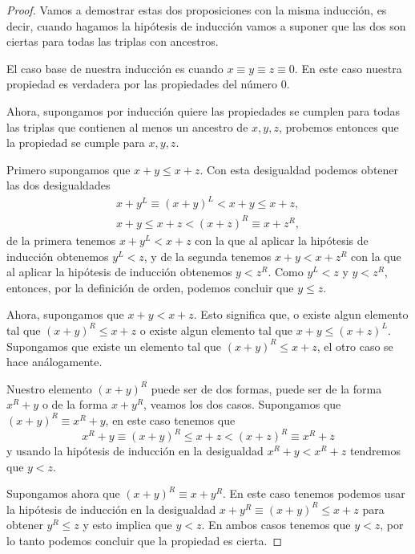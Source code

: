     \begin{proof}
        Vamos a demostrar estas dos proposiciones con la misma inducci\'on, es decir, cuando hagamos la hip\'otesis de inducci\'on vamos a suponer que las dos son ciertas para todas las triplas con ancestros.

        El caso base de nuestra inducci\'on es cuando $x\equiv y \equiv z \equiv 0$. En este caso nuestra propiedad es verdadera por las propiedades del n\'umero $0$.

        Ahora, supongamos por inducci\'on quiere las propiedades se cumplen para todas las triplas que contienen al menos un ancestro de $x,y,z$, probemos entonces que la propiedad se cumple para $x,y,z$.

        Primero supongamos que $x+y\le x+z$. Con esta desigualdad podemos obtener las dos desigualdades
        \begin{align*}
            x+y^L \equiv (x+y)^L < x+y \le x + z,\\
            x+y \le x+z < (x+z)^R \equiv x+z^R,
        \end{align*}
        de la primera tenemos $x + y^L < x + z$ con la que al aplicar la hip\'otesis de inducci\'on obtenemos $y^L < z$, y de la segunda tenemos $x+y < x+z^R$ con la que al aplicar la hip\'otesis de inducci\'on obtenemos $y < z^R$. Como $y^L < z$ y $y < z^R$, entonces, por la definici\'on de orden, podemos concluir que $y \le z$.

        Ahora, supongamos que $x+y < x+z$. Esto significa que, o existe algun elemento tal que $(x+y)^R \le x+z$ o existe algun elemento tal que $x+y \le (x+z)^L$. Supongamos que existe un elemento tal que $(x+y)^R \le x+z$, el otro caso se hace an\'alogamente.

        Nuestro elemento $(x+y)^R$ puede ser de dos formas, puede ser de la forma $x^R+y$ o de la forma $x+y^R$, veamos los dos casos. Supongamos que $(x+y)^R\equiv x^R+y$, en este caso tenemos que
        \[
            x^R+y \equiv (x+y)^R \le x+z < (x+z)^R\equiv x^R + z
        \]
        y usando la hip\'otesis de inducci\'on en la desigualdad $x^R+y < x^R + z$ tendremos que $y < z$.

        Supongamos ahora que $(x+y)^R\equiv x+y^R$. En este caso tenemos podemos usar la hip\'otesis de inducci\'on en la desigualdad $x+y^R \equiv (x+y)^R \le x+z$ para obtener $y^R \le z$ y esto implica que $y < z$. En ambos casos tenemos que $y < z$, por lo tanto podemos concluir que la propiedad es cierta.
    \end{proof}


